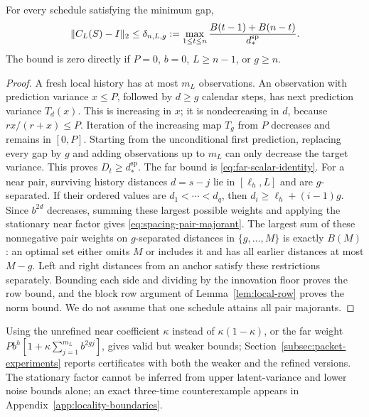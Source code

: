 \begin{proposition}
\label{prop:spacing-locality}
For every schedule satisfying the minimum gap,
\begin{equation}
 \lVert C_L(S)-I\rVert_2\le\delta_{n,L,g}:=
 \max_{1\le t\le n}\frac{B(t-1)+B(n-t)}{d_*^{\mathrm{sp}}}.
 \label{eq:spacing-delta}
\end{equation}
The bound is zero directly if $P=0$, $b=0$, $L\ge n-1$, or $g\ge n$.
\end{proposition}
\begin{proof}
A fresh local history has at most $m_L$ observations. An observation with
prediction variance $x\le P$, followed by $d\ge g$ calendar steps, has next
prediction variance $T_d(x)$. This is increasing in $x$; it is nondecreasing
in $d$, because $rx/(r+x)\le P$. Iteration of the increasing map $T_g$
from $P$ decreases and remains in $[0,P]$. Starting from the unconditional
first prediction, replacing every gap by $g$ and adding observations up to
$m_L$ can only decrease the target variance. This proves
$D_t\ge d_*^{\mathrm{sp}}$.
The far bound is \eqref{eq:far-scalar-identity}. For a near pair, surviving
history distances $d=s-j$ lie in $[\ell_h,L]$ and are $g$-separated. If
their ordered values are $d_1<\cdots<d_q$, then
$d_i\ge\ell_h+(i-1)g$. Since $b^{2d}$ decreases, summing these largest
possible weights and applying the stationary near factor gives
\eqref{eq:spacing-pair-majorant}.
The largest sum of these nonnegative pair weights on $g$-separated distances
in $\{g,\ldots,M\}$ is exactly $B(M)$: an optimal set either omits $M$ or
includes it and has all earlier distances at most $M-g$. Left and right
distances from an anchor satisfy these restrictions separately. Bounding
each side and dividing by the innovation floor proves the row bound,
and the block row argument of Lemma~\ref{lem:local-row} proves the norm
bound. We do not assume that one schedule attains all pair majorants.
\end{proof}

Using the unrefined near coefficient $\kappa$ instead of
$\kappa(1-\kappa)$, or the far weight
$Pb^h[1+\kappa\sum_{j=1}^{m_L}b^{2gj}]$, gives valid but weaker bounds;
Section~\ref{subsec:packet-experiments} reports certificates with both the
weaker and the refined versions. The stationary factor cannot be inferred
from upper latent-variance and lower noise bounds alone; an exact three-time
counterexample appears in Appendix~\ref{app:locality-boundaries}.

